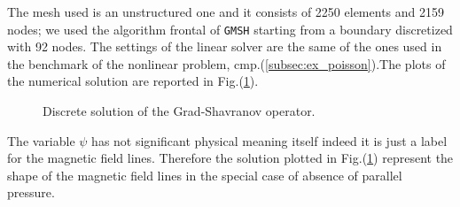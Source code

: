The mesh used is an unstructured one and it consists of 2250 elements and 2159 nodes; we used the algorithm frontal of \verb|GMSH| starting from a boundary discretized with 92 nodes. The settings of the linear solver are the same of the ones used in the benchmark of the nonlinear problem, cmp.(\ref{subsec:ex_poisson}).The plots of the numerical solution are reported in Fig.(\ref{fig:gs_linear}).

\begin{figure}
\centering
{}
\caption{Discrete solution of the Grad-Shavranov operator.}\label{fig:gs_linear}
\end{figure}

The variable $\psi$ has not significant physical meaning itself indeed it is just a label for the magnetic field lines. Therefore the solution plotted in Fig.(\ref{fig:gs_linear}) represent the shape of the magnetic field lines in the special case of absence of parallel pressure.
\newpage

